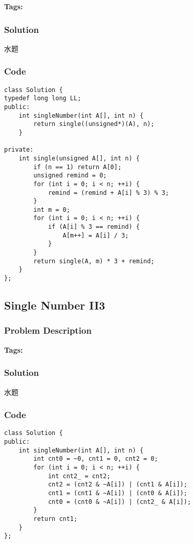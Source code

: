 \documentclass{article}
\begin{document}
\begin{CJK*}{UTF8}{gkai}
\textbf{Tags: }



\subsubsection*{Solution}
水题

\subsubsection*{Code}
\begin{lstlisting}
class Solution {
typedef long long LL;
public:
    int singleNumber(int A[], int n) {
        return single((unsigned*)(A), n);
    }

private:
    int single(unsigned A[], int n) {
        if (n == 1) return A[0];
        unsigned remind = 0;
        for (int i = 0; i < n; ++i) {
            remind = (remind + A[i] % 3) % 3;
        }
        int m = 0;
        for (int i = 0; i < n; ++i) {
            if (A[i] % 3 == remind) {
                A[m++] = A[i] / 3;
            }
        }
        return single(A, m) * 3 + remind;
    }
};

\end{lstlisting}


\subsection{ Single Number II3 }
\label{ Single Number II3 }

\subsubsection*{Problem Description}

\textbf{Tags: }



\subsubsection*{Solution}
水题

\subsubsection*{Code}
\begin{lstlisting}
class Solution {
public:
    int singleNumber(int A[], int n) {
        int cnt0 = ~0, cnt1 = 0, cnt2 = 0;
        for (int i = 0; i < n; ++i) {
            int cnt2_ = cnt2;
            cnt2 = (cnt2 & ~A[i]) | (cnt1 & A[i]);
            cnt1 = (cnt1 & ~A[i]) | (cnt0 & A[i]);
            cnt0 = (cnt0 & ~A[i]) | (cnt2_ & A[i]);
        }
        return cnt1;
    }
}; 
\end{lstlisting}



\end{CJK*}
\end{document}
